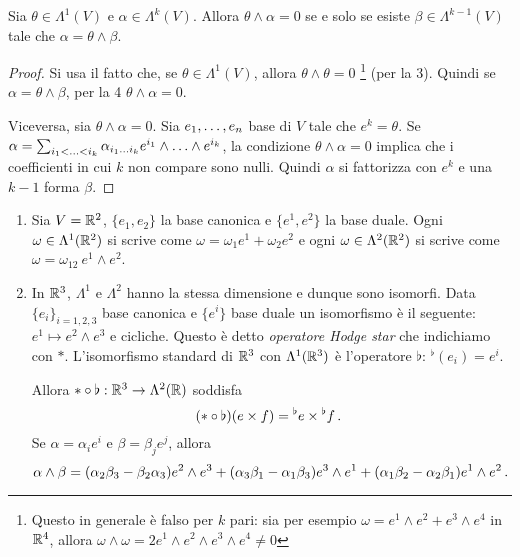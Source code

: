 \begin{corollary}
	Sia $\theta\in\Lambda^1(V)$ e $\alpha\in\Lambda^k(V)$. Allora $\theta\wedge\alpha=0$ se e solo se esiste $\beta\in\Lambda^{k-1}(V)$ tale che $\alpha = \theta \wedge \beta$.
\end{corollary}
\begin{proof}
	Si usa il fatto che, se $\theta\in\Lambda^1(V)$, allora $\theta\wedge\theta=0$ \footnote{Questo in generale è falso per $k$ pari: sia per esempio $\omega=e^1\wedge e^2+e^3\wedge e^4$ in $\R^4$, allora $\omega\wedge\omega = 2e^1\wedge e^2 \wedge e^3\wedge e^4 \not=0$} (per la 3).
	Quindi se $\alpha=\theta\wedge\beta$, per la 4 $\theta\wedge\alpha=0$.
	
	Viceversa, sia $\theta\wedge\alpha=0$. Sia $\seqb en,$ base di $V$ tale che $e^k=\theta$. Se $\alpha=\sum_{i_1<\ldots<i_k} \alpha_{\seqb ik{}} e^{i_1}\wedge\ldots\wedge e^{i_k}$, la condizione $\theta\wedge\alpha=0$ implica che i coefficienti in cui $k$ non compare sono nulli. Quindi $\alpha$ si fattorizza con $e^k$ e una $k-1$ forma $\beta$.
\end{proof}

\begin{example}
	\begin{enumerate}
		\item Sia $V = \R^2$, $\{e_1,e_2\}$ la base canonica e $\{e^1,e^2\}$ la base duale. Ogni $\omega\in\Lambda^1(\R^2)$ si scrive come $\omega = \omega_1e^1+\omega_2e^2$ e ogni $\omega\in\Lambda^2(\R^2)$ si scrive come $\omega = \omega_{12}\ e^1\wedge e^2$. 
		
		\item In $\R^3$, $\Lambda^1$ e $\Lambda^2$ hanno la stessa dimensione e dunque sono isomorfi. Data $\{e_i\}_{i=1,2,3}$ base canonica e $\{e^i\}$ base duale un isomorfismo è il seguente: $e^1\mapsto e^2\wedge e^3$ e cicliche.
		Questo è detto \emph{operatore Hodge star} che indichiamo con $*$. L'isomorfismo standard di $\R^3$ con $\Lambda^1(\R^3)$ è l'operatore $\flat$: $^\flat(e_i) = e^i$.
		
		Allora $*\circ \flat:\R^3\to \Lambda^2(\R)$ soddisfa
		\begin{equation*}
			(*\circ \flat) (e\times f) = {^\flat e} \times {^\flat f}\punto 
		\end{equation*}
		Se $\alpha = \alpha_ie^i$ e $\beta = \beta_j e^j$, allora
		\begin{equation*}
			\alpha\wedge\beta = (\alpha_2\beta_3 - \beta_2\alpha_3)e^2\wedge e^3 + (\alpha_3\beta_1 - \alpha_1\beta_3)e^3\wedge e^1 + (\alpha_1\beta_2 - \alpha_2\beta_1) e^1\wedge e^2 \punto
		\end{equation*}
	\end{enumerate}
\end{example}

